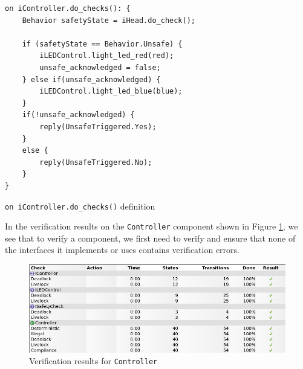 \documentclass[12pt]{scrreprt}
\begin{document}
\begin{listing}[!ht]
\begin{verbatim}
on iController.do_checks(): {
    Behavior safetyState = iHead.do_check();
	
    if (safetyState == Behavior.Unsafe) {
        iLEDControl.light_led_red(red);
        unsafe_acknowledged = false;
    } else if(unsafe_acknowledged) {
        iLEDControl.light_led_blue(blue);
    }
    if(!unsafe_acknowledged) {
        reply(UnsafeTriggered.Yes);
    }
    else {
        reply(UnsafeTriggered.No);
    }
}

 \end{verbatim} 
\caption{\texttt{on iController.do\_checks()} definition} \label{mdo_checks}
 \end{listing} 
 
In the verification results on the \texttt{Controller} component shown in Figure \ref{fig:controll_verif}, we see that to verify a component, we first need to verify and ensure that none of the interfaces it implements or uses contains verification errors.
 
\begin{figure}[H]
    \centering
    \includegraphics[width=\textwidth]{Figures/results/modelling_figures/Controller/Controller_verification.png}
    \caption{Verification results for \texttt{Controller}}
    \label{fig:controll_verif}
\end{figure}
\end{document}
